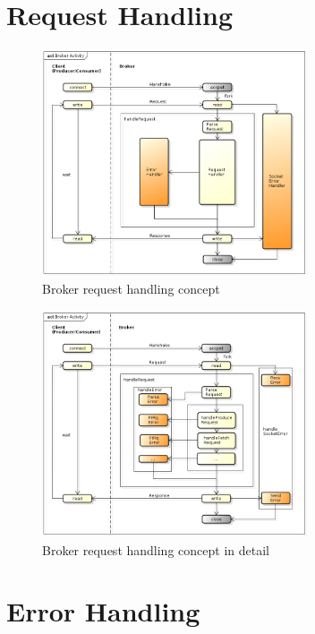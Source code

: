 \section{Request Handling}



\begin{figure}[H]
    \centering
    \includegraphics[width=0.7\textwidth]{images/broker-activity.png}
    \caption{Broker request handling concept}
    \label{fig:broker-activity.png}
\end{figure}

\begin{figure}[H]
    \centering
    \includegraphics[width=0.7\textwidth]{images/broker-activity-detail.png}
    \caption{Broker request handling concept in detail}
    \label{fig:broker-activity-detail.png}
\end{figure}


\section{Error Handling}

